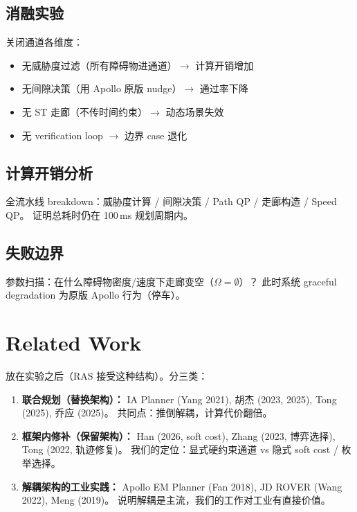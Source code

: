 \documentclass[a4paper,12pt]{article}
\begin{document}
\subsection{消融实验}

关闭通道各维度：
\begin{itemize}
  \item 无威胁度过滤（所有障碍物进通道）$\to$ 计算开销增加
  \item 无间隙决策（用 Apollo 原版 nudge）$\to$ 通过率下降
  \item 无 ST 走廊（不传时间约束）$\to$ 动态场景失效
  \item 无 verification loop $\to$ 边界 case 退化
\end{itemize}

\subsection{计算开销分析}

全流水线 breakdown：威胁度计算 / 间隙决策 / Path QP / 走廊构造 / Speed QP。
证明总耗时仍在 100\,ms 规划周期内。

\subsection{失败边界}

参数扫描：在什么障碍物密度/速度下走廊变空（$\Omega = \emptyset$）？
此时系统 graceful degradation 为原版 Apollo 行为（停车）。

\section{Related Work}

放在实验之后（RAS 接受这种结构）。分三类：

\begin{enumerate}
  \item \textbf{联合规划（替换架构）：}
        IA Planner (Yang 2021), 胡杰 (2023, 2025), Tong (2025), 乔应 (2025)。
        共同点：推倒解耦，计算代价翻倍。
  \item \textbf{框架内修补（保留架构）：}
        Han (2026, soft cost), Zhang (2023, 博弈选择), Tong (2022, 轨迹修复)。
        我们的定位：显式硬约束通道 vs 隐式 soft cost / 枚举选择。
  \item \textbf{解耦架构的工业实践：}
        Apollo EM Planner (Fan 2018), JD ROVER (Wang 2022), Meng (2019)。
        说明解耦是主流，我们的工作对工业有直接价值。
\end{enumerate}
\end{document}
